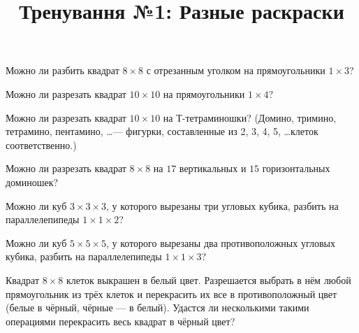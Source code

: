 



\title{Тренування №1: Разные раскраски}
\maketitle

\begin{problem}
	Можно ли разбить квадрат $8 \times 8$ с отрезанным уголком на прямоугольники $1 \times 3$?

\end{problem}

\begin{problem}
	Можно ли разрезать квадрат $10 \times 10$ на прямоугольники $1 \times 4$?
\end{problem}

\begin{problem}
	Можно ли разрезать квадрат $10 \times 10$ на Т-тетраминошки? (Домино, тримино,
тетрамино, пентамино, \dots --- фигурки, составленные из 2, 3, 4, 5, \dots клеток
соответственно.)
\end{problem}

\begin{problem}
	Можно ли разрезать квадрат $8 \times 8$ на $17$ вертикальных и $15$ горизонтальных доминошек?
\end{problem}

\begin{problem}
	Можно ли куб $3 \times 3 \times 3$, у которого вырезаны три угловых кубика, разбить на параллелепипеды $1 \times 1 \times 2$?
\end{problem}

\begin{problem}
	Можно ли куб $5 \times 5 \times 5$, у которого вырезаны два противоположных угловых кубика, разбить на параллелепипеды $1 \times 1 \times 3$?
\end{problem}

\begin{problem}
	Квадрат $8 \times 8$ клеток выкрашен в белый цвет. Разрешается выбрать в нём любой прямоугольник из трёх клеток и перекрасить их все в противоположный цвет (белые в чёрный, чёрные --- в белый). Удастся ли несколькими такими операциями перекрасить весь квадрат в чёрный цвет?
\end{problem}

